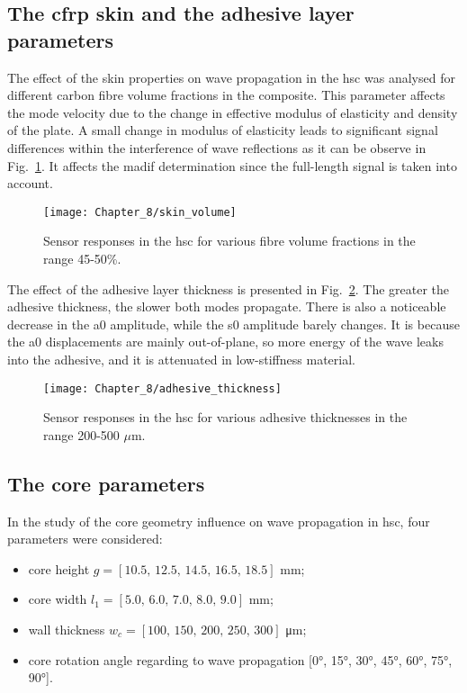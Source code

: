 \subsection{The \ac{cfrp} skin and the adhesive layer parameters}

The effect of the skin properties on wave propagation in the \ac{hsc} was analysed for different carbon fibre volume fractions in the composite.
This parameter affects the mode velocity due to the change in effective modulus of elasticity and density of the plate.
A small change in modulus of elasticity leads to significant signal differences within the interference of wave reflections as it can be observe in Fig.~\ref{fig:skin_volume}.
It affects the \ac{madif} determination since the full-length signal is taken into account.

\begin{figure}
	\begin{center}
		\texttt{[image: Chapter\_8/skin\_volume]}
	\end{center}
		\caption{Sensor responses in the \acf{hsc} for various fibre volume fractions in the range 45-50\%.}
	\label{fig:skin_volume}
\end{figure}

The effect of the adhesive layer thickness is presented in Fig.~\ref{fig:adhesive_thickness}.
The greater the adhesive thickness, the slower both modes propagate.
There is also a noticeable decrease in the \ac{a0} amplitude, while the \ac{s0} amplitude barely changes.
It is because the \ac{a0} displacements are mainly out-of-plane, so more energy of the wave leaks into the adhesive, and it is attenuated in low-stiffness material.

\begin{figure}
	\begin{center}
		\texttt{[image: Chapter\_8/adhesive\_thickness]}
	\end{center}
	\caption{Sensor responses in the \acf{hsc} for various adhesive thicknesses in the range 200-500 \(\mu\)m.}
	\label{fig:adhesive_thickness}
\end{figure}

\subsection{The core parameters}
In the study of the core geometry influence on wave propagation in \ac{hsc}, four parameters were considered:
\begin{itemize}
	\item core height \(g=[10.5,\,12.5,\,14.5,\,16.5,\,18.5]\) \unit{\mm};
	\item core width \(l_1=[5.0,\,6.0,\,7.0,\,8.0,\,9.0]\) \unit{\mm};
	\item wall thickness \(w_c=[100,\,150,\,200,\,250,\,300]\) \unit{\micro\m};
	\item core rotation angle regarding to wave propagation [\ang{0}, \ang{15}, \ang{30}, \ang{45}, \ang{60}, \ang{75}, \ang{90}].
\end{itemize}

